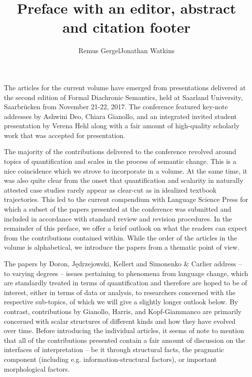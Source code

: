 \documentclass[output=paper]{langsci/langscibook}
\title{Preface with an editor, abstract and citation footer}
\author{Remus Gergel\affiliation{Universität des Saarlandes}\lastand Jonathan Watkins\affiliation{Universität des Saarlandes}}
\begin{document}
\maketitle

\noindent The articles for the current volume have emerged from presentations delivered at the second edition of Formal Diachronic Semantics, held at Saarland University, Saarbrücken from November 21-22, 2017. The conference featured key-note addresses by Ashwini Deo, Chiara Gianollo, and an integrated invited student presentation by Verena Hehl along with a fair amount of high-quality scholarly work that was accepted for presentation.

The majority of the contributions delivered to the conference revolved around topics of quantification and scales in the process of semantic change. This is a nice coincidence which we strove to incorporate in a volume. At the same time, it was also quite clear from the onset that quantification and scalarity in naturally attested case studies rarely appear as clear-cut as in idealized textbook trajectories. This led to the current compendium with Language Science Press for which a subset of the papers presented at the conference was submitted and included in accordance with standard review and revision procedures. In the remainder of this preface, we offer a brief outlook on what the readers can expect from the contributions contained within. While the order of the articles in the volume is alphabetical, we introduce the papers from a thematic point of view.

The papers by Doron, Jędrzejowski, Kellert and Simonenko \& Carlier address – to varying degrees – issues pertaining to phenomena from language change, which are standardly treated in terms of quantification and therefore are hoped to be of interest, either in terms of data or analysis, to researchers concerned with the respective sub-topics, of which we will give a slightly longer outlook below. By contrast, contributions by Gianollo, Harris, and Kopf-Giammanco are primarily concerned with scalar structures of different kinds and how they have evolved over time. Before introducing the individual articles, it seems of note to mention that all of the contributions presented contain a fair amount of discussion on the interfaces of interpretation – be it through structural facts, the pragmatic component (including e.g. information-structural factors), or important morphological factors. 
\end{document}
